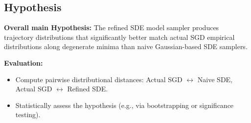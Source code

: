 \documentclass[11pt]{article}
\begin{document}
\subsection{Hypothesis}

\textbf{Overall main Hypothesis:} The refined SDE model sampler produces trajectory distributions that significantly better match actual SGD empirical distributions along degenerate minima than naive Gaussian-based SDE samplers.

\textbf{Evaluation:}
\begin{itemize}
\item Compute pairwise distributional distances: Actual SGD $\leftrightarrow$ Naive SDE, Actual SGD $\leftrightarrow$ Refined SDE.
\item Statistically assess the hypothesis (e.g., via bootstrapping or significance testing).
\end{itemize}
\end{document}
